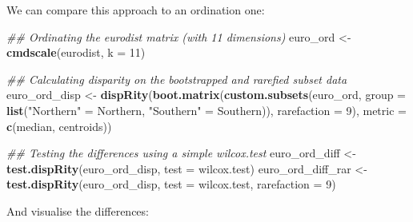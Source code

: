 \documentclass[]{book}
\newenvironment{Shaded}{\begin{snugshade}}{\end{snugshade}}
\newcommand{\CommentTok}[1]{\textcolor[rgb]{0.56,0.35,0.01}{\textit{#1}}}
\newcommand{\DataTypeTok}[1]{\textcolor[rgb]{0.13,0.29,0.53}{#1}}
\newcommand{\DecValTok}[1]{\textcolor[rgb]{0.00,0.00,0.81}{#1}}
\newcommand{\KeywordTok}[1]{\textcolor[rgb]{0.13,0.29,0.53}{\textbf{#1}}}
\newcommand{\NormalTok}[1]{#1}
\newcommand{\StringTok}[1]{\textcolor[rgb]{0.31,0.60,0.02}{#1}}
\begin{document}
We can compare this approach to an ordination one:

\begin{Shaded}
\begin{Highlighting}[]
\CommentTok{## Ordinating the eurodist matrix (with 11 dimensions)}
\NormalTok{euro_ord <-}\StringTok{ }\KeywordTok{cmdscale}\NormalTok{(eurodist, }\DataTypeTok{k =} \DecValTok{11}\NormalTok{)}

\CommentTok{## Calculating disparity on the bootstrapped and rarefied subset data}
\NormalTok{euro_ord_disp <-}\StringTok{ }\KeywordTok{dispRity}\NormalTok{(}\KeywordTok{boot.matrix}\NormalTok{(}\KeywordTok{custom.subsets}\NormalTok{(euro_ord, }\DataTypeTok{group =}
        \KeywordTok{list}\NormalTok{(}\StringTok{"Northern"}\NormalTok{ =}\StringTok{ }\NormalTok{Northern, }\StringTok{"Southern"}\NormalTok{ =}\StringTok{ }\NormalTok{Southern)), }\DataTypeTok{rarefaction =} \DecValTok{9}\NormalTok{),}
        \DataTypeTok{metric =} \KeywordTok{c}\NormalTok{(median, centroids))}

\CommentTok{## Testing the differences using a simple wilcox.test}
\NormalTok{euro_ord_diff <-}\StringTok{ }\KeywordTok{test.dispRity}\NormalTok{(euro_ord_disp, }\DataTypeTok{test =}\NormalTok{ wilcox.test)}
\NormalTok{euro_ord_diff_rar <-}\StringTok{ }\KeywordTok{test.dispRity}\NormalTok{(euro_ord_disp, }\DataTypeTok{test =}\NormalTok{ wilcox.test, }\DataTypeTok{rarefaction =} \DecValTok{9}\NormalTok{)}
\end{Highlighting}
\end{Shaded}

And visualise the differences:
\end{document}
